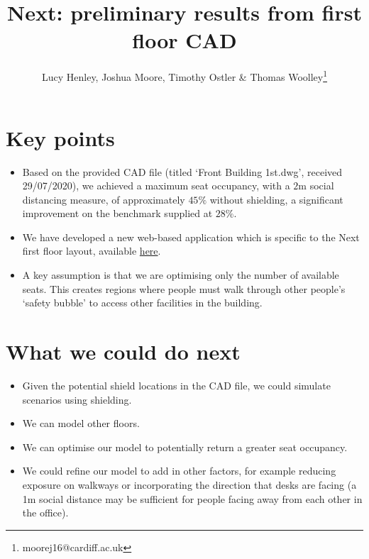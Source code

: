 \documentclass[11pt,a4paper]{article}
\title{Next: preliminary results from first floor CAD}
\author{Lucy Henley, Joshua Moore, Timothy Ostler \& Thomas Woolley\footnote{moorej16@cardiff.ac.uk}}
\begin{document}
\maketitle

\section*{Key points}
\begin{itemize}
\item Based on the provided CAD file (titled `Front Building 1st.dwg', received 29/07/2020), we achieved a maximum seat occupancy, with a $2$m social distancing measure, of approximately $45\%$ without shielding, a significant improvement on the benchmark supplied at $28\%$.
\item We have developed a new web-based application which is specific to the Next first floor layout, available \href{https://lucyhenley.shinyapps.io/Next_seating/?fbclid=IwAR2Rx-OmoSkYHlw6BnQSKLgJGQt7VJvaX2IJYbqgKu4MK9YZxoZn1gBBAaEp}{here}. %
\item A key assumption is that we are optimising only the number of available seats. This creates regions where people must walk through other people's `safety bubble' to access other facilities in the building.
\end{itemize}

\section*{What we could do next}
\begin{itemize}
\item Given the potential shield locations in the CAD file, we could simulate scenarios using shielding.
\item We can model other floors.
\item We can optimise our model to potentially return a greater seat occupancy.
\item We could refine our model to add in other factors, for example reducing exposure on walkways or incorporating the direction that desks are facing (a 1m social distance may be sufficient for people facing away from each other in the office).
\end{itemize}
\end{document}
